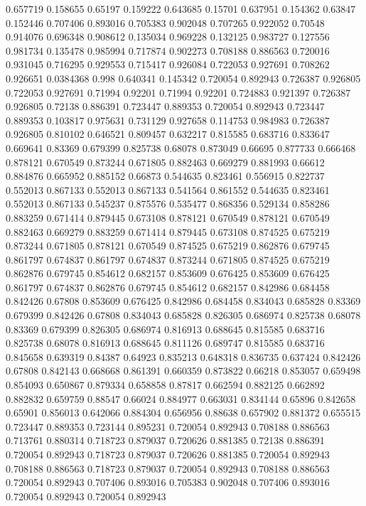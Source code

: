 0.657719 0.158655
0.65197 0.159222
0.643685 0.15701
0.637951 0.154362
0.63847 0.152446
0.707406 0.893016
0.705383 0.902048
0.707265 0.922052
0.70548 0.914076
0.696348 0.908612
0.135034 0.969228
0.132125 0.983727
0.127556 0.981734
0.135478 0.985994
0.717874 0.902273
0.708188 0.886563
0.720016 0.931045
0.716295 0.929553
0.715417 0.926084
0.722053 0.927691
0.708262 0.926651
0.0384368 0.998
0.640341 0.145342
0.720054 0.892943
0.726387 0.926805
0.722053 0.927691
0.71994 0.92201
0.71994 0.92201
0.724883 0.921397
0.726387 0.926805
0.72138 0.886391
0.723447 0.889353
0.720054 0.892943
0.723447 0.889353
0.103817 0.975631
0.731129 0.927658
0.114753 0.984983
0.726387 0.926805
0.810102 0.646521
0.809457 0.632217
0.815585 0.683716
0.833647 0.669641
0.83369 0.679399
0.825738 0.68078
0.873049 0.66695
0.877733 0.666468
0.878121 0.670549
0.873244 0.671805
0.882463 0.669279
0.881993 0.66612
0.884876 0.665952
0.885152 0.66873
0.544635 0.823461
0.556915 0.822737
0.552013 0.867133
0.552013 0.867133
0.541564 0.861552
0.544635 0.823461
0.552013 0.867133
0.545237 0.875576
0.535477 0.868356
0.529134 0.858286
0.883259 0.671414
0.879445 0.673108
0.878121 0.670549
0.878121 0.670549
0.882463 0.669279
0.883259 0.671414
0.879445 0.673108
0.874525 0.675219
0.873244 0.671805
0.878121 0.670549
0.874525 0.675219
0.862876 0.679745
0.861797 0.674837
0.861797 0.674837
0.873244 0.671805
0.874525 0.675219
0.862876 0.679745
0.854612 0.682157
0.853609 0.676425
0.853609 0.676425
0.861797 0.674837
0.862876 0.679745
0.854612 0.682157
0.842986 0.684458
0.842426 0.67808
0.853609 0.676425
0.842986 0.684458
0.834043 0.685828
0.83369 0.679399
0.842426 0.67808
0.834043 0.685828
0.826305 0.686974
0.825738 0.68078
0.83369 0.679399
0.826305 0.686974
0.816913 0.688645
0.815585 0.683716
0.825738 0.68078
0.816913 0.688645
0.811126 0.689747
0.815585 0.683716
0.845658 0.639319
0.84387 0.64923
0.835213 0.648318
0.836735 0.637424
0.842426 0.67808
0.842143 0.668668
0.861391 0.660359
0.873822 0.66218
0.853057 0.659498
0.854093 0.650867
0.879334 0.658858
0.87817 0.662594
0.882125 0.662892
0.882832 0.659759
0.88547 0.66024
0.884977 0.663031
0.834144 0.65896
0.842658 0.65901
0.856013 0.642066
0.884304 0.656956
0.88638 0.657902
0.881372 0.655515
0.723447 0.889353
0.723144 0.895231
0.720054 0.892943
0.708188 0.886563
0.713761 0.880314
0.718723 0.879037
0.720626 0.881385
0.72138 0.886391
0.720054 0.892943
0.718723 0.879037
0.720626 0.881385
0.720054 0.892943
0.708188 0.886563
0.718723 0.879037
0.720054 0.892943
0.708188 0.886563
0.720054 0.892943
0.707406 0.893016
0.705383 0.902048
0.707406 0.893016
0.720054 0.892943
0.720054 0.892943
